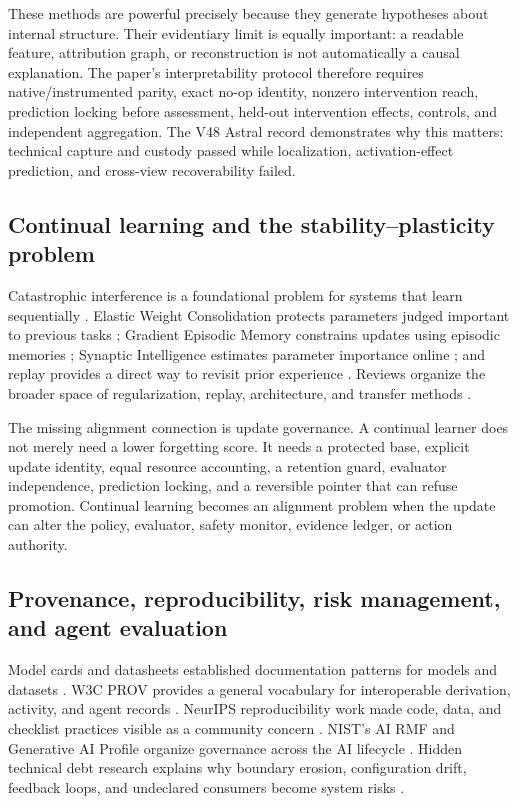 \documentclass[11pt,twoside]{article}
\newcommand{\sourcecite}[1]{\parencite{#1}}
\begin{document}
  These methods are powerful precisely because they generate hypotheses about internal structure. Their evidentiary limit is equally important: a readable feature, attribution graph, or reconstruction is not automatically a causal explanation. The paper's interpretability protocol therefore requires native/instrumented parity, exact no-op identity, nonzero intervention reach, prediction locking before assessment, held-out intervention effects, controls, and independent aggregation. The V48 Astral record demonstrates why this matters: technical capture and custody passed while localization, activation-effect prediction, and cross-view recoverability failed.

\subsection{Continual learning and the stability--plasticity problem}

  Catastrophic interference is a foundational problem for systems that learn sequentially \sourcecite{mccloskey1989interference}. Elastic Weight Consolidation protects parameters judged important to previous tasks \sourcecite{kirkpatrick2017forgetting}; Gradient Episodic Memory constrains updates using episodic memories \sourcecite{lopezpaz2017gem}; Synaptic Intelligence estimates parameter importance online \sourcecite{zenke2017continual}; and replay provides a direct way to revisit prior experience \sourcecite{rolnick2019experience}. Reviews organize the broader space of regularization, replay, architecture, and transfer methods \sourcecite{parisi2019continual,delange2021survey}.

  The missing alignment connection is update governance. A continual learner does not merely need a lower forgetting score. It needs a protected base, explicit update identity, equal resource accounting, a retention guard, evaluator independence, prediction locking, and a reversible pointer that can refuse promotion. Continual learning becomes an alignment problem when the update can alter the policy, evaluator, safety monitor, evidence ledger, or action authority.

\subsection{Provenance, reproducibility, risk management, and agent evaluation}

  Model cards and datasheets established documentation patterns for models and datasets \sourcecite{mitchell2019model,gebru2021datasheets}. W3C PROV provides a general vocabulary for interoperable derivation, activity, and agent records \sourcecite{w3c2013prov}. NeurIPS reproducibility work made code, data, and checklist practices visible as a community concern \sourcecite{pineau2021reproducibility}. NIST's AI RMF and Generative AI Profile organize governance across the AI lifecycle \sourcecite{tabassi2023airmf,autio2024genai}. Hidden technical debt research explains why boundary erosion, configuration drift, feedback loops, and undeclared consumers become system risks \sourcecite{sculley2015technical}.
\end{document}
